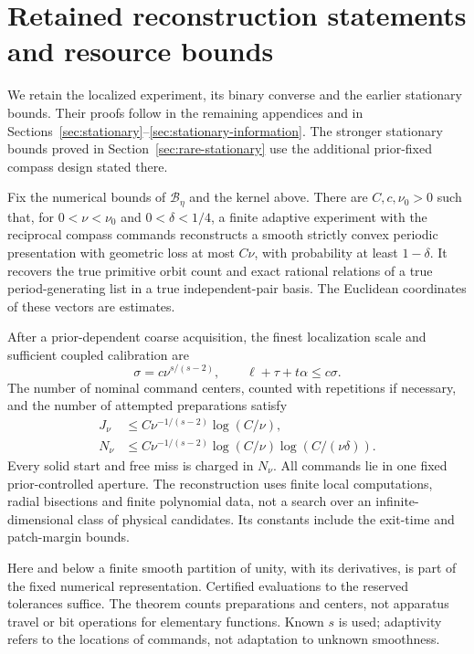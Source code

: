 \section{Retained reconstruction statements and resource bounds}
\label{sec:localized-statements}
\label{sec:retained-summaries}
We retain the localized experiment, its binary converse and the earlier
stationary bounds. Their proofs follow in the remaining appendices and
in Sections~\ref{sec:stationary}--\ref{sec:stationary-information}.
The stronger stationary bounds proved in Section~\ref{sec:rare-stationary}
use the additional prior-fixed compass design stated there.

\begin{theorem}\label{thm:adaptive}
Fix the numerical bounds of $\mathcal B_\eta$ and the kernel above.
There are $C,c,\nu_0>0$ such that, for $0<\nu<\nu_0$ and
$0<\delta<1/4$, a finite adaptive experiment with the reciprocal
compass commands reconstructs a smooth strictly convex periodic
presentation with geometric loss at most $C\nu$, with probability at
least $1-\delta$. It recovers the true primitive orbit count and exact
rational relations of a true period-generating list in a true independent-pair basis. The Euclidean coordinates of these vectors are estimates.

After a prior-dependent coarse acquisition, the finest localization
scale and sufficient coupled calibration are
\begin{equation}\label{eq:precision}
 \sigma=c\nu^{s/(s-2)},\qquad \ell+\tau+t\alpha\le c\sigma.
\end{equation}
The number of nominal command centers, counted with repetitions if
necessary, and the number of attempted preparations satisfy
\begin{align}
 J_\nu&\le C\nu^{-1/(s-2)}\log(C/\nu),\label{eq:centers}\\
 N_\nu&\le C\nu^{-1/(s-2)}\log(C/\nu)
                               \log(C/(\nu\delta)).\label{eq:attempts}
\end{align}
Every solid start and free miss is charged in $N_\nu$. All commands lie
in one fixed prior-controlled aperture. The reconstruction uses finite
local computations, radial bisections and finite polynomial data, not
a search over an infinite-dimensional class of physical candidates.
Its constants include the exit-time and patch-margin bounds.
\end{theorem}

Here and below a finite smooth partition of unity, with its derivatives,
is part of the fixed numerical representation. Certified evaluations
to the reserved tolerances suffice. The theorem counts preparations and
centers, not apparatus travel or bit operations for elementary functions.
Known $s$ is used; adaptivity refers to the locations of commands, not
adaptation to unknown smoothness.

